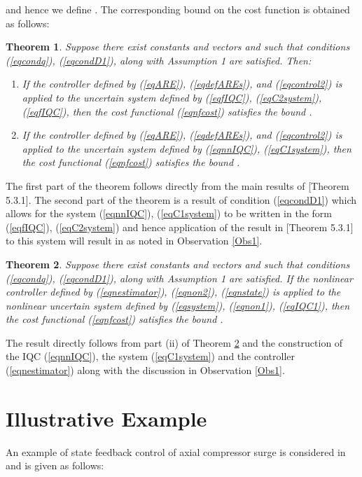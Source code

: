 \documentclass[twocolumn]{autart}
\newtheorem{theorem}{Theorem}
\newcommand{\startproof}{\vspace{0.01cm} \noindent {\bf \em Proof: }}
\newcommand{\finishproof}{\hfill }
\begin{document}
and hence we define .
The corresponding bound on the cost function is obtained as follows:

\begin{theorem}
Suppose there exist constants  and vectors   and  such that conditions (\ref{eqcondq}), (\ref{eqcondD1}), along with Assumption 1 are satisfied. Then:
\begin{enumerate}
\item If the controller defined by (\ref{eqARE}), (\ref{eqdefAREs}), and (\ref{eqcontrol2}) is applied to the uncertain system defined by (\ref{eqfIQC}), (\ref{eqC2system}), (\ref{eqfIQC}), then the cost functional (\ref{eqnfcost}) satisfies the bound .
\item If the controller defined by (\ref{eqARE}), (\ref{eqdefAREs}), and (\ref{eqcontrol2}) is applied to the  uncertain system defined by (\ref{eqnnIQC}), (\ref{eqC1system}),  then the cost functional (\ref{eqnfcost}) satisfies the bound .
\end{enumerate}
\end{theorem}
\vspace{0.9mm}
\startproof
The first part of the theorem follows directly from the main results of \cite{IP} [Theorem 5.3.1]. The second part of the theorem is a result of  condition (\ref{eqcondD1}) which allows for the system (\ref{eqnnIQC}), (\ref{eqC1system}) to be written in the form  (\ref{eqfIQC}), (\ref{eqC2system}) and hence application of the result in \cite{IP} [Theorem 5.3.1] to this system will result in  as noted in Observation \ref{Obs1}.
\finishproof
\begin{theorem}\label{th1}
Suppose there exist constants  and vectors   and  such that conditions (\ref{eqcondq}), (\ref{eqcondD1}), along with Assumption 1 are satisfied.  If the nonlinear controller defined by (\ref{eqnestimator}), (\ref{eqnon2}), (\ref{eqnstate}) is applied to the nonlinear uncertain system defined by (\ref{eqsystem}), (\ref{eqnon1}), (\ref{eqIQC1}), then the cost functional (\ref{eqnfcost}) satisfies the bound .
\end{theorem}
\vspace{0.25mm}
\startproof
The result directly follows from part (ii) of Theorem \ref{th1} and the construction of the IQC (\ref{eqnnIQC}), the system (\ref{eqC1system}) and the controller (\ref{eqnestimator}) along with the discussion in Observation \ref{Obs1}.
\finishproof
\section{Illustrative Example}\label{sec:example}
\vspace{0.25mm}
An example of state feedback control of axial compressor surge is considered in \cite{outputfeedback_petersen,Arcak_example,Krstic_Adaptive} and is given as follows:
\begin{small}

\end{small}
\end{document}
